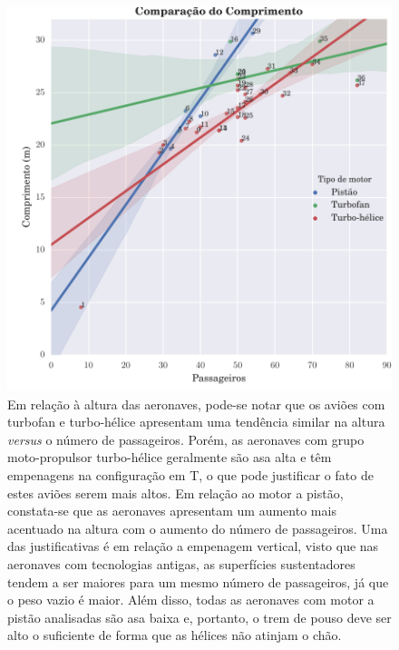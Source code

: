 \begin{figure}
\centering
\includegraphics{../autogenerated/graficos_comparativos/comprimento.pdf}
\caption[Comparação da altura]{Em relação à altura das aeronaves, pode-se notar que os aviões com turbofan e turbo-hélice apresentam uma tendência similar na altura \emph{versus} o número de passageiros.
Porém, as aeronaves com grupo moto-propulsor turbo-hélice geralmente são asa alta e têm empenagens na configuração em T, o que pode justificar o fato de estes aviões serem mais altos.
Em relação ao motor a pistão, constata-se que as aeronaves apresentam um aumento mais acentuado na altura com o aumento do número de passageiros.
Uma das justificativas é em relação a empenagem vertical, visto que nas aeronaves com tecnologias antigas, as superfícies sustentadores tendem a ser maiores para um mesmo número de passageiros, já que o peso vazio é maior. Além disso, todas as aeronaves com motor a pistão analisadas são asa baixa e, portanto, o trem de pouso deve ser alto o suficiente de forma que as hélices não atinjam o chão.}
\label{fig:comprimento}
\end{figure}


